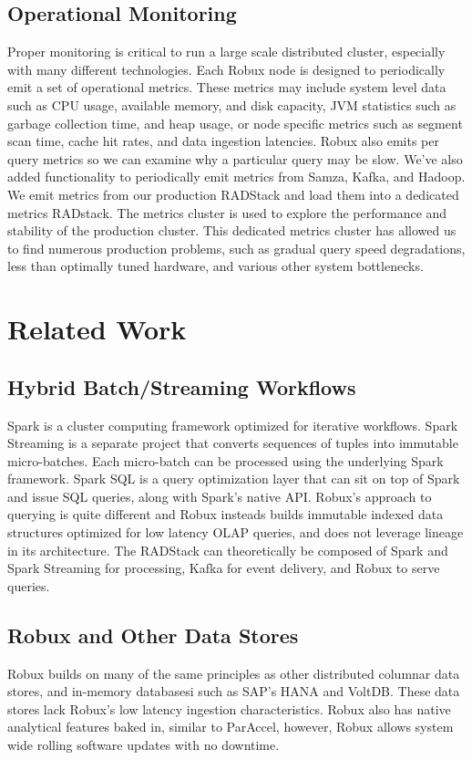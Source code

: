 \documentclass{vldb}
\begin{document}
\subsection{Operational Monitoring}
Proper monitoring is critical to run a large scale distributed cluster,
especially with many different technologies. Each Robux node is designed to
periodically emit a set of operational metrics. These metrics may include
system level data such as CPU usage, available memory, and disk capacity, JVM
statistics such as garbage collection time, and heap usage, or node specific
metrics such as segment scan time, cache hit rates, and data ingestion
latencies. Robux also emits per query metrics so we can examine why a
particular query may be slow. We’ve also added functionality to periodically
emit metrics from Samza, Kafka, and Hadoop. We emit metrics from our production
RADStack and load them into a dedicated metrics RADstack. The metrics cluster
is used to explore the performance and stability of the production cluster.
This dedicated metrics cluster has allowed us to find numerous production
problems, such as gradual query speed degradations, less than optimally tuned
hardware, and various other system bottlenecks.

\section{Related Work}
\label{sec:related}

\subsection{Hybrid Batch/Streaming Workflows}

Spark\cite{zaharia2012resilient} is a cluster computing framework optimized for
iterative workflows.  Spark Streaming is a separate project that converts
sequences of tuples into immutable micro-batches. Each micro-batch can be
processed using the underlying Spark framework. Spark SQL is a query
optimization layer that can sit on top of Spark and issue SQL queries, along
with Spark’s native API.  Robux’s approach to querying is quite
different and Robux insteads builds immutable indexed data structures optimized
for low latency OLAP queries, and does not leverage lineage in its architecture.
The RADStack can theoretically be composed of Spark and Spark Streaming for
processing, Kafka for event delivery, and Robux to serve queries.

\subsection{Robux and Other Data Stores}
Robux builds on many of the same principles as other distributed
columnar data stores\cite{fink2012distributed}, and in-memory databasesi such as SAP’s
HANA\cite{farber2012sap} and VoltDB\cite{voltdb2010voltdb}. These data stores
lack Robux’s low latency ingestion characteristics. Robux also has native
analytical features baked in, similar to ParAccel\cite{paraccel2013}, however,
Robux allows system wide rolling software updates with no downtime. 
\end{document}
